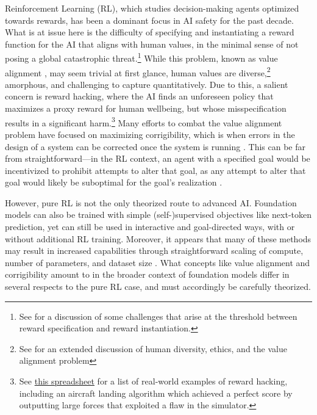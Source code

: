 Reinforcement Learning (RL), which studies decision-making agents optimized towards rewards, has been a dominant focus in AI safety for the past decade. What is at issue here is the difficulty of specifying and instantiating a reward function for the AI that aligns with human values, in the minimal sense of not posing a global catastrophic threat.\footnote{See \citet{Hubinger2019RisksFL} for a discussion of some challenges that arise at the threshold between reward specification and reward instantiation.} While this problem, known as value alignment \citep{gabriel2020artificial, yudkowsky2016ai}, may seem trivial at first glance, human values are diverse,\footnote{See \citet{gabriel2020artificial} for an extended discussion of human diversity, ethics, and the value alignment problem} amorphous, and challenging to capture quantitatively. Due to this, a salient concern is reward hacking, where the AI finds an unforeseen policy that maximizes a proxy reward for human wellbeing, but whose misspecification results in a significant harm.\footnote{See \href{https://docs.google.com/spreadsheets/d/e/2PACX-1vRPiprOaC3HsCf5Tuum8bRfzYUiKLRqJmbOoC-32JorNdfyTiRRsR7Ea5eWtvsWzuxo8bjOxCG84dAg/pubhtml}{this spreadsheet} for a list of real-world examples of reward hacking, including an aircraft landing algorithm which achieved a perfect score by outputting large forces that exploited a flaw in the simulator.} Many efforts to combat the value alignment problem have focused on maximizing corrigibility, which is when errors in the design of a system can be corrected once the system is running \citep{soares2015corrigibility}. This can be far from straightforward—in the RL context, an agent with a specified goal would be incentivized to prohibit attempts to alter that goal, as any attempt to alter that goal would likely be suboptimal for the goal’s realization \citep{Omohundro2008TheBA}.

However, pure RL is not the only theorized route to advanced AI. Foundation models can also be trained with simple (self-)supervised objectives like next-token prediction, yet can still be used in interactive and goal-directed ways, with or without additional RL training. Moreover, it appears that many of these methods may result in increased capabilities through straightforward scaling of compute, number of parameters, and dataset size \citep{Hestness2017DeepLS, kaplan2020}. What concepts like value alignment and corrigibility amount to in the broader context of foundation models differ in several respects to the pure RL case, and must accordingly be carefully theorized. 

